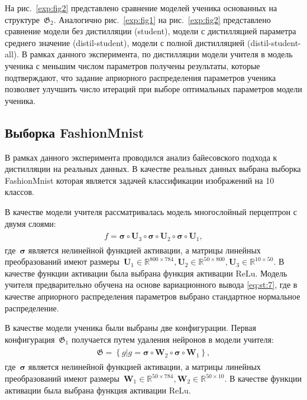 \documentclass[12pt]{a&t}
\begin{document}
На рис.~\ref{exp:fig2} представлено сравнение моделей ученика основанных на структуре~$\mathfrak{G}_2$. Аналогично рис.~\ref{exp:fig1} на рис.~\ref{exp:fig2} представлено сравнение модели без дистилляции (student), модели с дистилляцией параметра среднего значение (distil-student), модели с полной дистилляцией (distil-student-all). В рамках данного эксперимента, по дистилляции модели учителя в модель ученика с меньшим числом параметров получены результаты, которые подтверждают, что задание априорного распределения параметров ученика позволяет улучшить число итераций при выборе оптимальных параметров модели ученика.

\subsection{Выборка FashionMnist}

В рамках данного эксперимента проводился анализ байесовского подхода к дистилляции на реальных данных.  В качестве реальных данных выбрана выборка FashionMnist\cite{fashionmnist} которая является задачей классификации изображений на 10 классов.

В качестве модели учителя рассматривалась модель многослойный перцептрон с двумя слоями:
\begin{gather}
\label{eq:ex:4}
\begin{aligned}
f = \bm{\sigma} \circ \mathbf{U}_{3} \circ  \bm{\sigma} \circ \mathbf{U}_{2} \circ \bm{\sigma} \circ \mathbf{U}_{1},
\end{aligned}
\end{gather}
где~$\bm{\sigma}$ является нелинейной функцией активации, а матрицы линейных преобразований имеют размеры~$\mathbf{U}_{1} \in \mathbb{R}^{800 \times 784}, \mathbf{U}_{2} \in \mathbb{R}^{50 \times 800},  \mathbf{U}_{3} \in \mathbb{R}^{10 \times 50}$. В качестве функции активации была выбрана функция активации $\text{ReLu}$.
Модель учителя предварительно обучена на основе вариационного вывода \eqref{eq:st:7}, где в качестве априорного распределения параметров выбрано стандартное нормальное распределение.

В качестве модели ученика были выбраны две конфигурации. Первая конфигурация~$\mathfrak{G}_1$ получается путем удаления нейронов в модели учителя:
\begin{gather}
\label{eq:ex:5}
\begin{aligned}
\mathfrak{G} = \left\{g| g = \bm{\sigma} \circ \mathbf{W}_2 \circ \bm{\sigma} \circ \mathbf{W}_1\right\},
\end{aligned}
\end{gather}
где~$\bm{\sigma}$ является нелинейной функцией активации, а матрицы линейных преобразований имеют размеры~$\mathbf{W}_{1} \in \mathbb{R}^{50 \times 784}, \mathbf{W}_{2} \in \mathbb{R}^{50 \times 10}$. В качестве функции активации была выбрана функция активации $\text{ReLu}$.
\end{document}
